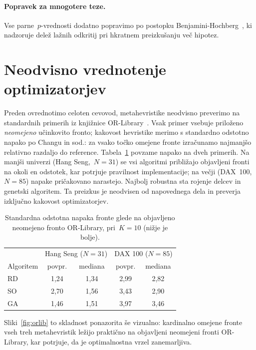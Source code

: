 \paragraph{Popravek za mnogotere teze.} Vse parne~$p$-vrednosti dodatno popravimo po postopku Benjamini-Hochberg~\cite{benjamini1995}, ki nadzoruje delež lažnih odkritij pri hkratnem preizkušanju več hipotez.

\section{Neodvisno vrednotenje optimizatorjev}
\label{sec:orlib}

Preden ovrednotimo celoten cevovod, metahevristike neodvisno preverimo na standardnih primerih iz knjižnice OR-Library~\cite{chang2000,beasley1990}. Vsak primer vsebuje priloženo \emph{neomejeno} učinkovito fronto; kakovost hevristike merimo s standardno odstotno napako po Changu in sod.: za vsako točko omejene fronte izračunamo najmanjšo relativno razdaljo do reference. Tabela~\ref{tab:orlib} povzame napako na dveh primerih. Na manjši univerzi (Hang Seng,~$N=31$) se vsi algoritmi približajo objavljeni fronti na okoli en odstotek, kar potrjuje pravilnost implementacije; na večji (DAX~100,~$N=85$) napake pričakovano narastejo. Najbolj robustna sta rojenje delcev in genetski algoritem. Ta preizkus je neodvisen od napovednega dela in preverja izključno kakovost optimizatorjev.

\begin{table}[htbp]
  \centering
  \caption{Standardna odstotna napaka fronte glede na objavljeno neomejeno fronto OR-Library, pri~$K=10$ (nižje je bolje).}
  \label{tab:orlib}
  \begin{tabular}{lcccc}
    \toprule
     & \multicolumn{2}{c}{Hang Seng ($N{=}31$)} & \multicolumn{2}{c}{DAX 100 ($N{=}85$)}\\
    Algoritem & povpr. & mediana & povpr. & mediana\\
    \midrule
    RD         & 1{,}24 & 1{,}34 & 2{,}99 & 2{,}82\\
    SO          & 2{,}70 & 1{,}56 & 3{,}43 & 2{,}90\\
    GA          & 1{,}46 & 1{,}51 & 3{,}97 & 3{,}46\\
    \bottomrule
  \end{tabular}
\end{table}

Sliki~\ref{fig:orlib} to skladnost ponazorita še vizualno: kardinalno omejene fronte vseh treh metahevristik ležijo praktično na objavljeni neomejeni fronti OR-Library, kar potrjuje, da je optimalnostna vrzel zanemarljiva.

